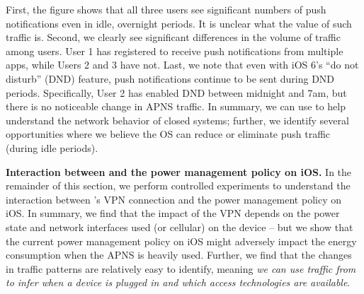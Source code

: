 First, the figure shows that all three users see significant numbers of push 
notifications even in idle, overnight periods. It is unclear what the value of 
such traffic is. Second, we clearly see significant differences in the volume 
of traffic among users. User 1 has registered to receive push notifications 
from multiple apps, while Users 2 and 3 have not. Last, we note that even 
with iOS 6's ``do not disturb'' (DND) feature, push notifications continue to be 
sent during DND periods. Specifically, User 2 has enabled DND between 
midnight and 7am, but there is no noticeable change in APNS traffic.
In summary, we can use \meddle to help understand the network 
behavior of closed systems; further, we identify several opportunities 
where we believe the OS can reduce or eliminate push traffic (during idle periods).

%

\noindent\textbf{Interaction between \meddle and the power management
  policy on iOS.}
In the remainder of this section, we perform controlled experiments 
to understand the interaction between \meddle's VPN connection and the power
management policy on iOS. In summary, we find that the impact of the VPN depends 
on the power state and network interfaces used (\wifi or cellular) on the
device -- but we show that the current power management policy on iOS
might adversely impact the energy consumption when the APNS is heavily used.
Further, we find that the changes in traffic patterns are relatively 
easy to identify, meaning \emph{we can use traffic from \meddle to infer 
when a device is plugged in and which access technologies are 
available}.

